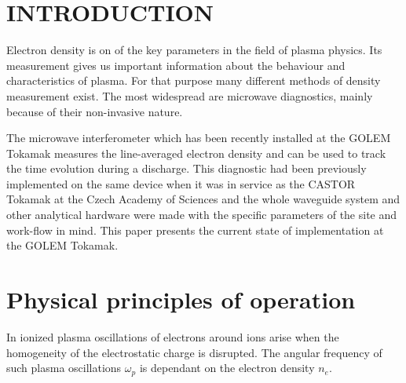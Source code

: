 \documentclass[twoside]{articlek}
\begin{document}
\sloppy
{}
\section{INTRODUCTION}
Electron density is on of the key parameters in the field of plasma physics. Its measurement gives us important information about the behaviour and characteristics of plasma. For that purpose many different methods of density measurement exist.%
The most widespread are microwave diagnostics, mainly because of their non-invasive nature. 

The microwave interferometer which has been recently installed at the GOLEM Tokamak measures the line-averaged electron density and can be used to track the time evolution during a discharge.%
This diagnostic had been previously implemented on the same device when it was in service as the CASTOR Tokamak %
at the Czech Academy of Sciences and the whole waveguide system and other analytical hardware were made with the specific parameters of the site and work-flow in mind. This paper presents the current state of implementation at the GOLEM Tokamak.

\section{Physical principles of operation} %

In ionized plasma oscillations of electrons around ions arise when the homogeneity of the electrostatic charge is disrupted. The angular frequency of such plasma oscillations $\omega_p$ is dependant on the electron density $n_e$. 
\end{document}
